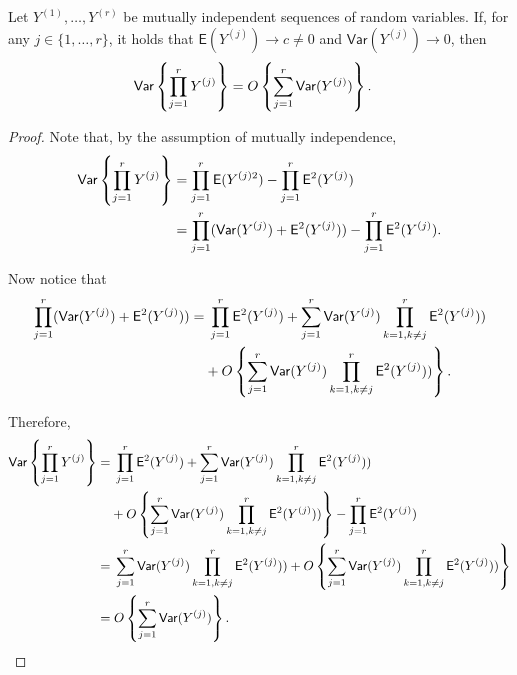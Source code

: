 \documentclass[oneside,11pt]{article}
\begin{document}
\begin{lemma}
    Let $Y^{(1)}, \dots, Y^{(r)}$ be mutually independent sequences of random variables. If, for any $j \in \{ 1, \dots, r\}$, it holds that $\mathsf{E} (Y^{(j)}) \to c \ne 0$ and $\mathsf{Var} (Y^{(j)}) \to 0$, then
    \begin{align*}
        \mathsf{Var} \left\{\prod_{j=1}^{r} Y^{(j)}\right\} &= O \left\{\sum_{j=1}^{r} \mathsf{Var} (Y^{(j)})\right\}.
    \end{align*}
\end{lemma}
\begin{proof}
    Note that, by the assumption of mutually independence,
    \begin{align*}
        \mathsf{Var} \left\{\prod_{j=1}^{r} Y^{(j)}\right\} &= \prod_{j=1}^{r} \mathsf{E} (Y^{(j)2}) - \prod_{j=1}^{r} \mathsf{E}^2 (Y^{(j)}) \\
        &= \prod_{j=1}^{r} (\mathsf{Var} (Y^{(j)}) + \mathsf{E}^2 (Y^{(j)})) - \prod_{j=1}^{r} \mathsf{E}^2 (Y^{(j)}).
    \end{align*}

    Now notice that
    \begin{align*}
        \prod_{j=1}^{r} (\mathsf{Var} (Y^{(j)}) + \mathsf{E}^2 (Y^{(j)})) =&\; \prod_{j=1}^{r} \mathsf{E}^2 (Y^{(j)}) + \sum_{j=1}^{r} \mathsf{Var} (Y^{(j)}) \prod_{k=1,k \ne j}^{r} \mathsf{E}^2 (Y^{(j)})) \\
        &+ O \left\{\sum_{j=1}^{r} \mathsf{Var} (Y^{(j)}) \prod_{k=1,k \ne j}^{r} \mathsf{E}^2 (Y^{(j)}))\right\}.
    \end{align*}

    Therefore,
    \begin{align*}
        \mathsf{Var} \left\{\prod_{j=1}^{r} Y^{(j)}\right\} =&\; \prod_{j=1}^{r} \mathsf{E}^2 (Y^{(j)}) + \sum_{j=1}^{r} \mathsf{Var} (Y^{(j)}) \prod_{k=1,k \ne j}^{r} \mathsf{E}^2 (Y^{(j)})) \\
        &+ O \left\{\sum_{j=1}^{r} \mathsf{Var} (Y^{(j)}) \prod_{k=1,k \ne j}^{r} \mathsf{E}^2 (Y^{(j)}))\right\} - \prod_{j=1}^{r} \mathsf{E}^2 (Y^{(j)}) \\
        =&\; \sum_{j=1}^{r} \mathsf{Var} (Y^{(j)}) \prod_{k=1,k \ne j}^{r} \mathsf{E}^2 (Y^{(j)})) + O \left\{\sum_{j=1}^{r} \mathsf{Var} (Y^{(j)}) \prod_{k=1,k \ne j}^{r} \mathsf{E}^2 (Y^{(j)}))\right\} \\
        =&\; O \left\{\sum_{j=1}^{r} \mathsf{Var} (Y^{(j)})\right\}.
    \end{align*}
\end{proof}
\end{document}
